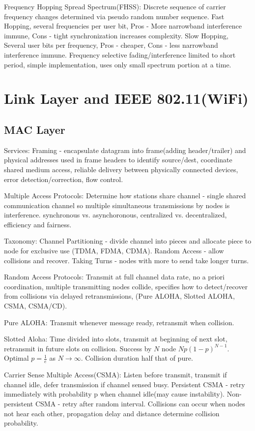\documentclass[9pt]{extarticle}
\begin{document}
\begin{multicols}{2}
Frequency Hopping Spread Spectrum(FHSS): Discrete sequence of carrier frequency changes determined via pseudo random number sequence. Fast Hopping, several frequencies per user bit, Pros - More narrowband interference immune, Cons - tight synchronization increases complexity. Slow Hopping, Several user bits per frequency, Pros - cheaper, Cons - less narrowband interference immune. Frequency selective fading/interference limited to short period, simple implementation, uses only small spectrum portion at a time.

\section{Link Layer and IEEE 802.11(WiFi)}

\subsection{MAC Layer}

Services: Framing - encapsulate datagram into frame(adding header/trailer) and physical addresses used in frame headers to identify source/dest, coordinate shared medium access, reliable delivery between physically
connected devices, error detection/correction, flow control.

Multiple Access Protocols: Determine how stations share channel - single shared communication channel so multiple simultaneous transmissions by nodes is interference. synchronous vs. asynchoronous, centralized vs. decentralized, efficiency and fairness.

Taxonomy: Channel Partitioning - divide channel into pieces and allocate piece to node for exclusive use (TDMA, FDMA, CDMA). Random Access - allow collisions and recover. Taking Turns - nodes with more to send take longer turns.

Random Access Protocols: Transmit at full channel data rate, no a priori coordination, multiple transmitting nodes collide, specifies how to detect/recover from collisions via delayed retransmissions, (Pure ALOHA, Slotted ALOHA, CSMA, CSMA/CD).

Pure ALOHA: Transmit whenever  message ready, retransmit when collision.

Slotted Aloha: Time divided into slots, transmit at beginning of next slot, retransmit in future slots on collision. Success by $N$ node $Np(1-p)^{N-1}$. Optimal $p=\frac{1}{e}$ as $N\rightarrow{\infty}$. Collision duration half that of pure.

Carrier Sense Multiple Access(CSMA): Listen before transmit, transmit if channel idle, defer transmission if channel sensed busy. Persistent CSMA - retry immediately with probability p when channel idle(may cause instability). Non-persistent CSMA - retry after random interval. Collisions can occur when nodes not hear each other, propagation delay and distance determine collision probability.


\end{multicols}
\end{document}
